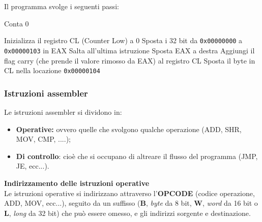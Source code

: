 \documentclass[a4paper,11pt]{article}
\begin{document}
Il programma svolge i seguenti passi:
\begin{algorithm}
\caption{Conta 0}
\begin{algorithmic}
	\STATE Inizializza il registro CL (Counter Low) a 0
	\STATE Sposta i 32 bit da \texttt{0x00000000} a \texttt{0x00000103} in EAX
			\STATE Salta all'ultima istruzione
		\ENDIF
		\STATE Sposta EAX a destra
		\STATE Aggiungi il flag carry (che prende il valore rimosso da EAX) al registro CL
	\ENDWHILE
	\STATE Sposta il byte in CL nella locazione \texttt{0x00000104}
\end{algorithmic}
\end{algorithm}

\subsubsection{Istruzioni assembler}
Le istruzioni assembler si dividono in:
\begin{itemize}
	\item \textbf{Operative:} ovvero quelle che svolgono qualche operazione (ADD, SHR, MOV, CMP, ....);
	\item \textbf{Di controllo}: cioè che si occupano di altreare il flusso del programma (JMP, JE, ecc...).
\end{itemize}

\par\medskip
\noindent
\textsf{\textbf{Indirizzamento delle istruzioni operative}} \\
Le istruzioni operative si indirizzano attraverso l'\textbf{OPCODE} (codice operazione, ADD, MOV, ecc...), seguito da un suffisso (\textbf{B}, \textit{byte} da 8 bit, \textbf{W}, \textit{word} da 16 bit o \textbf{L}, \textit{long} da 32 bit) che può essere omesso, e gli indirizzi sorgente e destinazione.
\end{document}
